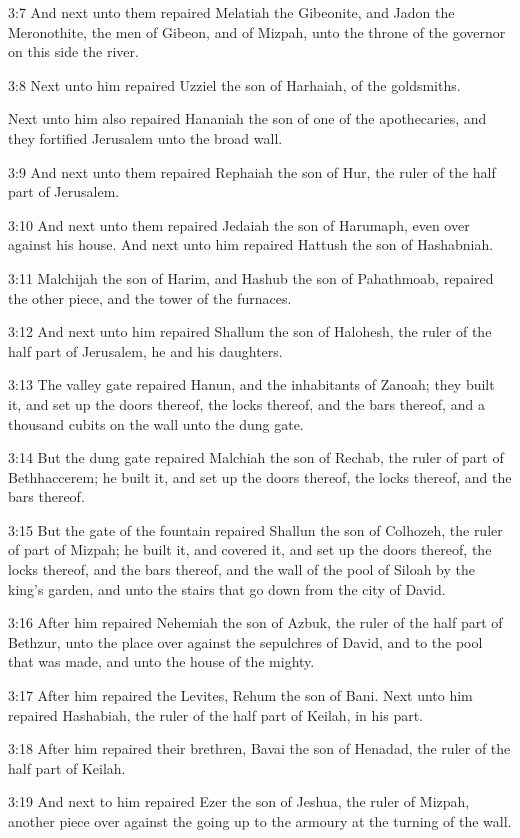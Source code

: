 3:7 And next unto them repaired Melatiah the Gibeonite, and Jadon the
Meronothite, the men of Gibeon, and of Mizpah, unto the throne of the
governor on this side the river.

3:8 Next unto him repaired Uzziel the son of Harhaiah, of the
goldsmiths.

Next unto him also repaired Hananiah the son of one of the
apothecaries, and they fortified Jerusalem unto the broad wall.

3:9 And next unto them repaired Rephaiah the son of Hur, the ruler of
the half part of Jerusalem.

3:10 And next unto them repaired Jedaiah the son of Harumaph, even
over against his house. And next unto him repaired Hattush the son of
Hashabniah.

3:11 Malchijah the son of Harim, and Hashub the son of Pahathmoab,
repaired the other piece, and the tower of the furnaces.

3:12 And next unto him repaired Shallum the son of Halohesh, the ruler
of the half part of Jerusalem, he and his daughters.

3:13 The valley gate repaired Hanun, and the inhabitants of Zanoah;
they built it, and set up the doors thereof, the locks thereof, and
the bars thereof, and a thousand cubits on the wall unto the dung
gate.

3:14 But the dung gate repaired Malchiah the son of Rechab, the ruler
of part of Bethhaccerem; he built it, and set up the doors thereof,
the locks thereof, and the bars thereof.

3:15 But the gate of the fountain repaired Shallun the son of
Colhozeh, the ruler of part of Mizpah; he built it, and covered it,
and set up the doors thereof, the locks thereof, and the bars thereof,
and the wall of the pool of Siloah by the king's garden, and unto the
stairs that go down from the city of David.

3:16 After him repaired Nehemiah the son of Azbuk, the ruler of the
half part of Bethzur, unto the place over against the sepulchres of
David, and to the pool that was made, and unto the house of the
mighty.

3:17 After him repaired the Levites, Rehum the son of Bani. Next unto
him repaired Hashabiah, the ruler of the half part of Keilah, in his
part.

3:18 After him repaired their brethren, Bavai the son of Henadad, the
ruler of the half part of Keilah.

3:19 And next to him repaired Ezer the son of Jeshua, the ruler of
Mizpah, another piece over against the going up to the armoury at the
turning of the wall.

